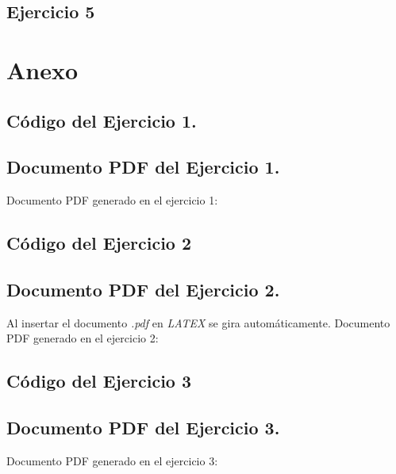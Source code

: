 \documentclass[a4paper]{article}
\begin{document}
\subsection{Ejercicio 5}\label{subsec:ej5}



\newpage
\section{Anexo}\label{anexo:an}
\subsection{Código del Ejercicio 1.} \label{anexo:ej1} 


\subsection{Documento PDF del Ejercicio 1.} \label{anexo:pdf1}
Documento PDF generado en el ejercicio 1:


\subsection{Código del Ejercicio 2} \label{anexo:ej2} 


\subsection{Documento PDF del Ejercicio 2.} \label{anexo:pdf2}
Al insertar el documento \textit{.pdf} en \textit{LATEX} se gira automáticamente. Documento PDF generado en el ejercicio 2:


\subsection{Código del Ejercicio 3} \label{anexo:ej3} 


\subsection{Documento PDF del Ejercicio 3.} \label{anexo:pdf3}
Documento PDF generado en el ejercicio 3:

\end{document}
